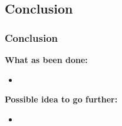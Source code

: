 \documentclass[9pt, notheorems]{beamer}
\theoremstyle{definition}
\theoremstyle{plain}
\theoremstyle{definition}
\begin{document}
\subsection{Conclusion}

\begin{frame}
    \frametitle{Conclusion}
    \textbf{What as been done:}
    \begin{itemize}
        \item
    \end{itemize}
    \textbf{Possible idea to go further:}
    \begin{itemize}
        \item
    \end{itemize}

\end{frame}
\end{document}
